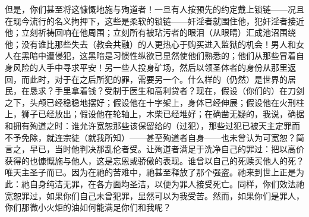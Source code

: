 但是，你们甚至将这慷慨地施与殉道者！一旦有人按预先的约定戴上锁链——况且在现今流行的名义拘押下，这些是柔软的锁链——奸淫者就围住他，犯奸淫者接近他；立刻祈祷回响在他周围；立刻所有被玷污者的眼泪（从眼睛）汇成池沼围绕他；没有谁比那些失去（教会共融）的人更热心于购买进入监狱的机会！男人和女人在黑暗中遭侵犯，这黑暗是习惯性纵欲已显然使他们熟悉的；他们从那些冒着自身风险的人手中寻求平安！另一些人投身矿场，然后以领圣体者的身份从那里返回，而此时，对于在之后所犯的罪，需要另一个。什么样的（仍然）是世界的居民，在恳求？手里拿着钱？受制于医生和高利贷者？现在，假设（你们的）在刀剑之下，头颅已经稳稳地摆好；假设他在十字架上，身体已经伸展；假设他在火刑柱上，狮子已经放出；假设他在轮轴上，木柴已经堆好；在确凿无疑的，我说，确据和拥有殉道之时：谁允许宽恕那些该保留给的（过犯），那些过犯已被天主定罪而不予免除，就连宗徒（就我所知）——甚至殉道者自身——也未曾认为可宽恕？简言之，早已，当时他判决那乱伦者受。让殉道者满足于洗净自己的罪过：把以高价获得的也慷慨施与他人，这是忘恩或骄傲的表现。谁曾以自己的死赎买他人的死？唯天主圣子而已。因为在祂的苦难中，祂甚至释放了那个强盗。祂来到世上正是为此：祂自身纯洁无罪，在各方面均圣洁，以便为罪人接受死亡。同样，你们效法祂宽恕罪过，如果你们自己未曾犯罪，显然可以为我受苦。然而，如果你们是罪人，你们那微小火炬的油如何能满足你们和我呢？\par

